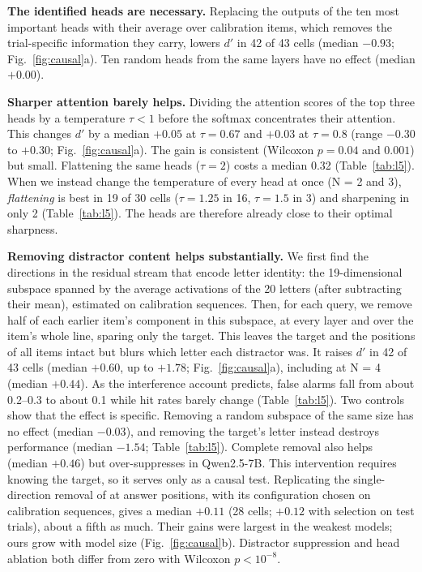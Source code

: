 \documentclass{article}
\newcommand{\dprime}{$d'$}
\begin{document}
\textbf{The identified heads are necessary.} Replacing the outputs of the ten most important heads with their average over calibration items, which removes the trial-specific information they carry, lowers \dprime{} in 42 of 43 cells (median $-0.93$; Fig.~\ref{fig:causal}a). Ten random heads from the same layers have no effect (median $+0.00$).

\textbf{Sharper attention barely helps.} Dividing the attention scores of the top three heads by a temperature $\tau<1$ before the softmax concentrates their attention. This changes \dprime{} by a median $+0.05$ at $\tau=0.67$ and $+0.03$ at $\tau=0.8$ (range $-0.30$ to $+0.30$; Fig.~\ref{fig:causal}a). The gain is consistent (Wilcoxon $p=0.04$ and $0.001$) but small. Flattening the same heads ($\tau=2$) costs a median 0.32 (Table~\ref{tab:l5}). When we instead change the temperature of every head at once (N = 2 and 3), \emph{flattening} is best in 19 of 30 cells ($\tau=1.25$ in 16, $\tau=1.5$ in 3) and sharpening in only 2 (Table~\ref{tab:l5}). The heads are therefore already close to their optimal sharpness.

\textbf{Removing distractor content helps substantially.} We first find the directions in the residual stream that encode letter identity: the 19-dimensional subspace spanned by the average activations of the 20 letters (after subtracting their mean), estimated on calibration sequences. Then, for each query, we remove half of each earlier item's component in this subspace, at every layer and over the item's whole line, sparing only the target. This leaves the target and the positions of all items intact but blurs which letter each distractor was. It raises \dprime{} in 42 of 43 cells (median $+0.60$, up to $+1.78$; Fig.~\ref{fig:causal}a), including at N = 4 (median $+0.44$). As the interference account predicts, false alarms fall from about 0.2--0.3 to about 0.1 while hit rates barely change (Table~\ref{tab:l5}). Two controls show that the effect is specific. Removing a random subspace of the same size has no effect (median $-0.03$), and removing the target's letter instead destroys performance (median $-1.54$; Table~\ref{tab:l5}). Complete removal also helps (median $+0.46$) but over-suppresses in Qwen2.5-7B. This intervention requires knowing the target, so it serves only as a causal test. Replicating the single-direction removal of \citet{xiong2026superposition} at answer positions, with its configuration chosen on calibration sequences, gives a median $+0.11$ (28 cells; $+0.12$ with selection on test trials), about a fifth as much. Their gains were largest in the weakest models; ours grow with model size (Fig.~\ref{fig:causal}b). Distractor suppression and head ablation both differ from zero with Wilcoxon $p<10^{-8}$.
\end{document}
